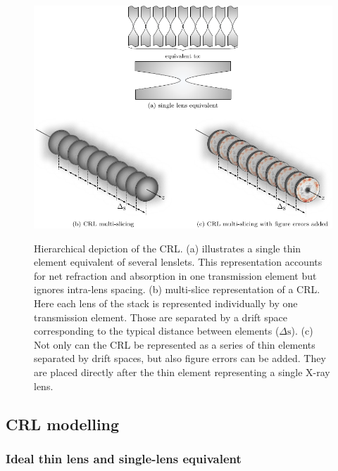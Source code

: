 \begin{refsection}
\begin{figure}[t]
    \centering
    {\includegraphics[width=0.8\linewidth]{figures/compressed/models.pdf}}
    \caption[Hierarchical CRL representation]{Hierarchical depiction of the CRL. (a) illustrates a single thin element equivalent of several lenslets. This representation accounts for net refraction and absorption in one transmission element but ignores intra-lens spacing. (b) multi-slice representation of a CRL. Here each lens of the stack is represented individually by one transmission element. Those are separated by a drift space corresponding to the typical distance between elements ($\Delta\text{s}$). (c) Not only can the CRL be represented as a series of thin elements separated by drift spaces, but also figure errors can be added. They are placed directly after the thin element representing a single X-ray lens.}
    \label{fig:models}
\end{figure}

\subsection{CRL modelling}\label{sec:CRL_modelling}

\subsubsection*{Ideal thin lens and single-lens equivalent}


\end{refsection}
